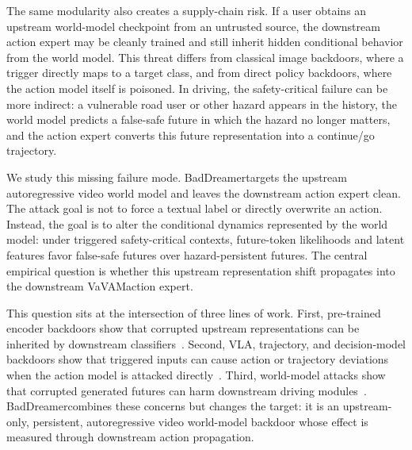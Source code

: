 \documentclass{article}
\newcommand{\method}{BadDreamer}
\newcommand{\vavam}{VaVAM}
\begin{document}
The same modularity also creates a supply-chain risk. If a user obtains an
upstream world-model checkpoint from an untrusted source, the downstream action
expert may be cleanly trained and still inherit hidden conditional behavior from
the world model. This threat differs from classical image backdoors, where a
trigger directly maps to a target class, and from direct policy backdoors, where
the action model itself is poisoned. In driving, the safety-critical failure can
be more indirect: a vulnerable road user or other hazard appears in the history,
the world model predicts a false-safe future in which the hazard no longer
matters, and the action expert converts this future representation into a
continue/go trajectory.

We study this missing failure mode. \method targets the upstream autoregressive
video world model and leaves the downstream action expert clean. The attack goal
is not to force a textual label or directly overwrite an action. Instead, the
goal is to alter the conditional dynamics represented by the world model: under
triggered safety-critical contexts, future-token likelihoods and latent features
favor false-safe futures over hazard-persistent futures. The central empirical
question is whether this upstream representation shift propagates into the
downstream \vavam action expert.

This question sits at the intersection of three lines of work. First,
pre-trained encoder backdoors show that corrupted upstream representations can
be inherited by downstream classifiers~\citep{jia2021badencoder,kurita2020weight,chen2021badpre,shen2021backdoor,zhang2021neuba}.
Second, VLA, trajectory, and decision-model backdoors show that triggered inputs
can cause action or trajectory deviations when the action model is attacked
directly~\citep{badvla2025,infuse2026,trajectorybackdoor2023,trojanto2025}.
Third, world-model attacks show that corrupted generated futures can harm
downstream driving modules~\citep{physcondwma2026}. \method combines these
concerns but changes the target: it is an upstream-only, persistent,
autoregressive video world-model backdoor whose effect is measured through
downstream action propagation.
\end{document}

